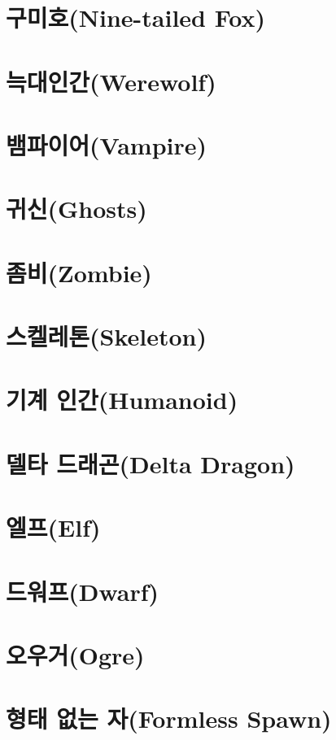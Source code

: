 \documentclass{report}
\begin{document}
	\section{구미호(Nine-tailed Fox)}
		
	
	\section{늑대인간(Werewolf)}
		
	
	\section{뱀파이어(Vampire)}
		
	
	\section{귀신(Ghosts)}
		
	
	\section{좀비(Zombie)}
		
	
	\section{스켈레톤(Skeleton)}
		
		
	\section{기계 인간(Humanoid)}
		
	
	\section{델타 드래곤(Delta Dragon)}
		
	
	\section{엘프(Elf)}
		
		
	\section{드워프(Dwarf)}
		
	
	\section{오우거(Ogre)}
		
	
	\section{형태 없는 자(Formless Spawn)}
		
	
\end{document}

